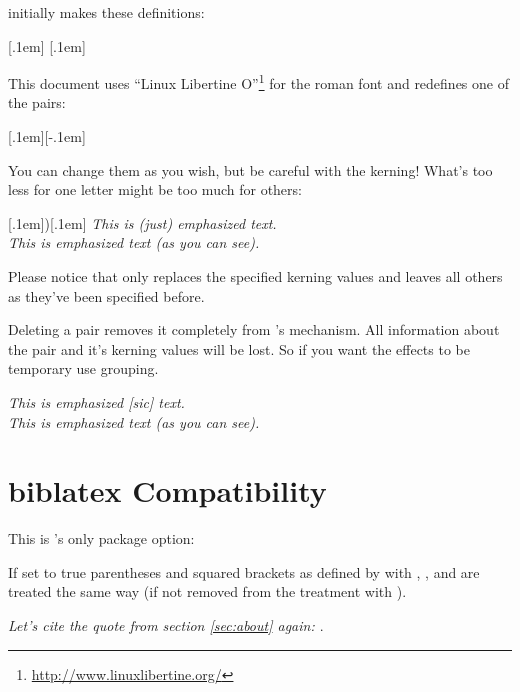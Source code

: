 \documentclass[DIV10,toc=index,toc=bib]{cnpkgdoc}
\begin{document}
\embrac initially makes these definitions:
\begin{beispiel}
 \AddEmph{(}{)}[.1em]
 \AddEmph{[}{]}[.1em]
\end{beispiel}
This document uses ``Linux Libertine O''\footnote{\url{http://www.linuxlibertine.org/}}
for the roman font and redefines one of the pairs:
\begin{beispiel}
 \RenewEmph{[}{]}[.1em][-.1em]
\end{beispiel}

You can change them as you wish, but be careful with the kerning! What's too less
for one letter might be too much for others:
\begin{beispiel}
 \RenewEmph{(}[.1em]{)}[.1em]
 \emph{This is (just) emphasized text.} \\ %
 \emph{This is emphasized text (as you can see).} %
\end{beispiel}

Please notice that  only replaces the specified kerning values
and leaves all others as they've been specified before.

Deleting a pair removes it completely from \embrac's mechanism. All information
about the pair and it's kerning values will be lost. So if you want the effects
to be temporary use grouping.
\begin{beispiel}
 \DeleteEmph[]
 \emph{This is emphasized [sic] text.} \\
 \emph{This is emphasized text (as you can see).}
\end{beispiel}

\section{biblatex Compatibility}
This is \embrac's only package option:
\begin{beschreibung}
  If set to true parentheses
 and squared brackets as defined by  with ,
 ,  and  are treated
 the same way (if not removed from the treatment with ).
\end{beschreibung}

\begin{beispiel}
 \emph{Let's cite the quote from section \ref{sec:about} again: \cite{bringhurst04}}.
\end{beispiel}
\end{document}
